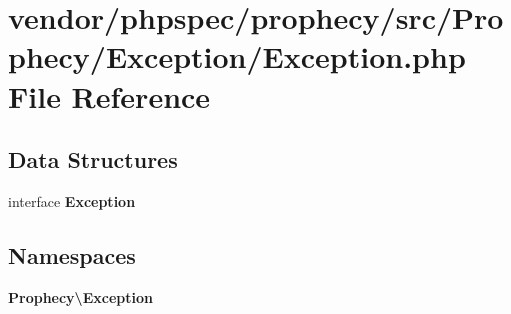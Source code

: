 \section{vendor/phpspec/prophecy/src/\+Prophecy/\+Exception/\+Exception.php File Reference}
\label{phpspec_2prophecy_2src_2_prophecy_2_exception_2_exception_8php}
\subsection*{Data Structures}
\begin{DoxyCompactItemize}
\item 
interface {\bf Exception}
\end{DoxyCompactItemize}
\subsection*{Namespaces}
\begin{DoxyCompactItemize}
\item 
 {\bf Prophecy\textbackslash{}\+Exception}
\end{DoxyCompactItemize}
